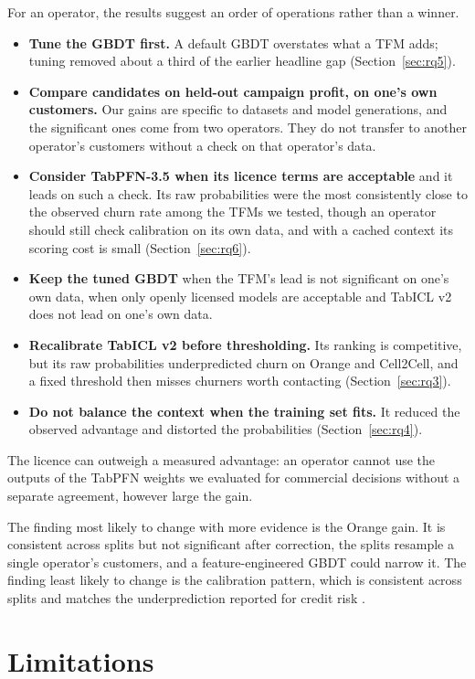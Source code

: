 \documentclass[11pt]{article}
\newcommand{\tfm}{TFM\xspace}
\newcommand{\tfms}{TFMs\xspace}
\begin{document}
For an operator, the results suggest an order of operations rather than a winner.
\begin{itemize}
\item \textbf{Tune the GBDT first.} A default GBDT overstates what a \tfm adds; tuning removed about a third of the
  earlier headline gap (Section~\ref{sec:rq5}).
\item \textbf{Compare candidates on held-out campaign profit, on one's own customers.} Our gains are specific to
  datasets and model generations, and the significant ones come from two operators. They do not transfer to another
  operator's customers without a check on that operator's data.
\item \textbf{Consider TabPFN-3.5 when its licence terms are acceptable} and it leads on such a check. Its raw
  probabilities were the most consistently close to the observed churn rate among the \tfms we tested, though an
  operator should still check calibration on its own data, and with a cached context its scoring cost is small
  (Section~\ref{sec:rq6}).
\item \textbf{Keep the tuned GBDT} when the \tfm's lead is not significant on one's own data, when only openly licensed
  models are acceptable and TabICL v2 does not lead on one's own data.
\item \textbf{Recalibrate TabICL v2 before thresholding.} Its ranking is competitive, but its raw probabilities
  underpredicted churn on Orange and Cell2Cell, and a fixed threshold then misses churners worth contacting
  (Section~\ref{sec:rq3}).
\item \textbf{Do not balance the context when the training set fits.} It reduced the observed advantage and distorted
  the probabilities (Section~\ref{sec:rq4}).
\end{itemize}
The licence can outweigh a measured advantage: an operator cannot use the outputs of the TabPFN weights we evaluated
for commercial decisions without a separate agreement, however large the gain.

The finding most likely to change with more evidence is the Orange gain. It is consistent across splits but not
significant after correction, the splits resample a single operator's customers, and a feature-engineered GBDT
\cite{tschalzev2026tabprep} could narrow it. The finding least likely to change is the calibration pattern, which is
consistent across splits and matches the underprediction reported for credit risk \cite{baesens2026creditrisk}.

\section{Limitations}\label{sec:lim}
\end{document}
